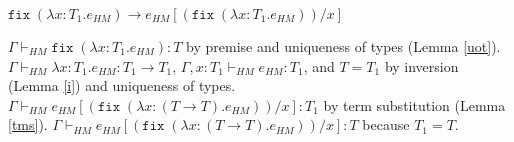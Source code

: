 \begin{case}
$\mathtt{fix}\;(\lambda x:T_{1}.e_{HM})\rightarrow e_{HM}[(\mathtt{fix}\;(\lambda x:T_{1}.e_{HM}))/x]$

$\Gamma\vdash_{HM}\mathtt{fix}\;(\lambda x:T_{1}.e_{HM}):T$ by premise and uniqueness of types (Lemma \ref{uot}).  $\Gamma\vdash_{HM}\lambda x:T_{1}.e_{HM}:T_{1}\rightarrow T_{1}$, $\Gamma,x:T_{1}\vdash_{HM}e_{HM}:T_{1}$, and $T=T_{1}$ by inversion (Lemma \ref{i}) and uniqueness of types.  $\Gamma\vdash_{HM}e_{HM}[(\mathtt{fix}\;(\lambda x:(T\rightarrow T).e_{HM}))/x]:T_{1}$ by term substitution (Lemma \ref{tms}).  $\Gamma\vdash_{HM}e_{HM}[(\mathtt{fix}\;(\lambda x:(T\rightarrow T).e_{HM}))/x]:T$ because $T_{1}=T$.
\end{case}